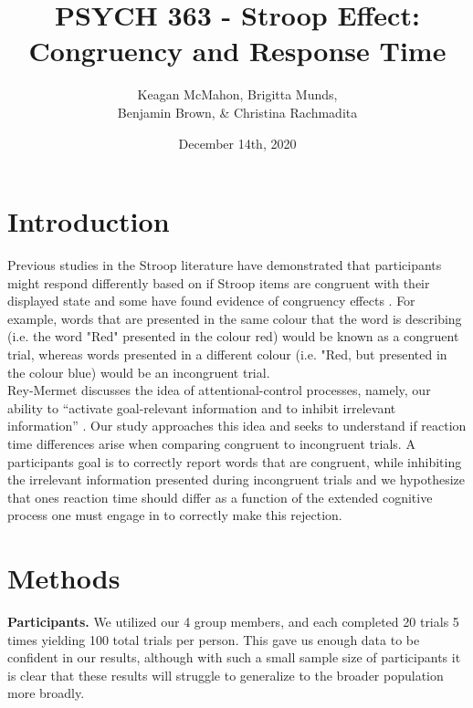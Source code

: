 \documentclass{article}
\author{Keagan McMahon, Brigitta Munds, \\ Benjamin Brown, \& Christina Rachmadita}
\date{December 14th, 2020}
\title{PSYCH 363 - Stroop Effect: Congruency and Response Time}
\begin{document}
\maketitle
\tableofcontents



\section{Introduction}
\label{sec:org8ef1c4f}

\hspace{1em} Previous studies in the Stroop literature have demonstrated that participants might respond differently based on if Stroop items are congruent with their displayed state and some have found evidence of congruency effects \cite{SpinelliGiacomo2020WMLD}. For example, words that are presented in the same colour that the word is describing (i.e. the word "Red" presented in the colour red) would be known as a congruent trial, whereas words presented in a different colour (i.e. "Red, but presented in the colour blue) would be an incongruent trial.\\

Rey-Mermet discusses the idea of attentional-control processes, namely, our ability to ``activate goal-relevant information and to inhibit irrelevant information'' \cite{Mermet2020Faib}. Our study approaches this idea and seeks to understand if reaction time differences arise when comparing congruent to incongruent trials. A participants goal is to correctly report words that are congruent, while inhibiting the irrelevant information presented during incongruent trials and we hypothesize that ones reaction time should differ as a function of the extended cognitive process one must engage in to correctly make this rejection. 

\section{Methods}
\label{sec:org284648d}

\hspace{1em} \textbf{Participants.} We utilized our 4 group members, and each completed 20 trials 5 times yielding 100 total trials per person. This gave us enough data to be confident in our results, although with such a small sample size of participants it is clear that these results will struggle to generalize to the broader population more broadly. \\
\end{document}
